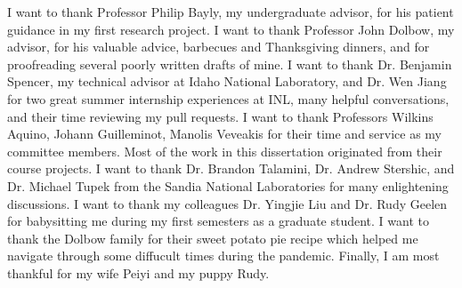 \acknowledgements

I want to thank Professor Philip Bayly, my undergraduate advisor, for his patient guidance in my first research project. I want to thank Professor John Dolbow, my advisor, for his valuable advice, barbecues and Thanksgiving dinners, and for proofreading several poorly written drafts of mine. I want to thank Dr. Benjamin Spencer, my technical advisor at Idaho National Laboratory, and Dr. Wen Jiang for two great summer internship experiences at INL, many helpful conversations, and their time reviewing my pull requests. I want to thank Professors Wilkins Aquino, Johann Guilleminot, Manolis Veveakis for their time and service as my committee members. Most of the work in this dissertation originated from their course projects. I want to thank Dr. Brandon Talamini, Dr. Andrew Stershic, and Dr. Michael Tupek from the Sandia National Laboratories for many enlightening discussions. I want to thank my colleagues Dr. Yingjie Liu and Dr. Rudy Geelen for babysitting me during my first semesters as a graduate student. I want to thank the Dolbow family for their sweet potato pie recipe which helped me navigate through some diffucult times during the pandemic. Finally, I am most thankful for my wife Peiyi and my puppy Rudy.
